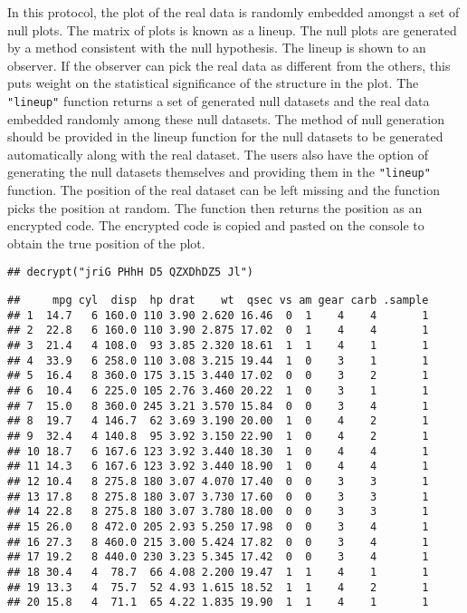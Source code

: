 In this protocol, the plot of the real data is randomly embedded amongst
a set of null plots. The matrix of plots is known as a lineup. The null
plots are generated by a method consistent with the null hypothesis. The
lineup is shown to an observer. If the observer can pick the real data
as different from the others, this puts weight on the statistical
significance of the structure in the plot. The \texttt{"lineup"}
function returns a set of generated null datasets and the real data
embedded randomly among these null datasets. The method of null
generation should be provided in the lineup function for the null
datasets to be generated automatically along with the real dataset. The
users also have the option of generating the null datasets themselves
and providing them in the \texttt{"lineup"} function. The position of
the real dataset can be left missing and the function picks the position
at random. The function then returns the position as an encrypted code.
The encrypted code is copied and pasted on the console to obtain the
true position of the plot.

\begin{Shaded}
\begin{Highlighting}[]
\NormalTok{(}\NormalTok{(}\NormalTok{(}\NormalTok{)}
\end{Highlighting}
\end{Shaded}

\begin{verbatim}
## decrypt("jriG PHhH D5 QZXDhDZ5 Jl")
\end{verbatim}

\begin{verbatim}
##     mpg cyl  disp  hp drat    wt  qsec vs am gear carb .sample
## 1  14.7   6 160.0 110 3.90 2.620 16.46  0  1    4    4       1
## 2  22.8   6 160.0 110 3.90 2.875 17.02  0  1    4    4       1
## 3  21.4   4 108.0  93 3.85 2.320 18.61  1  1    4    1       1
## 4  33.9   6 258.0 110 3.08 3.215 19.44  1  0    3    1       1
## 5  16.4   8 360.0 175 3.15 3.440 17.02  0  0    3    2       1
## 6  10.4   6 225.0 105 2.76 3.460 20.22  1  0    3    1       1
## 7  15.0   8 360.0 245 3.21 3.570 15.84  0  0    3    4       1
## 8  19.7   4 146.7  62 3.69 3.190 20.00  1  0    4    2       1
## 9  32.4   4 140.8  95 3.92 3.150 22.90  1  0    4    2       1
## 10 18.7   6 167.6 123 3.92 3.440 18.30  1  0    4    4       1
## 11 14.3   6 167.6 123 3.92 3.440 18.90  1  0    4    4       1
## 12 10.4   8 275.8 180 3.07 4.070 17.40  0  0    3    3       1
## 13 17.8   8 275.8 180 3.07 3.730 17.60  0  0    3    3       1
## 14 22.8   8 275.8 180 3.07 3.780 18.00  0  0    3    3       1
## 15 26.0   8 472.0 205 2.93 5.250 17.98  0  0    3    4       1
## 16 27.3   8 460.0 215 3.00 5.424 17.82  0  0    3    4       1
## 17 19.2   8 440.0 230 3.23 5.345 17.42  0  0    3    4       1
## 18 30.4   4  78.7  66 4.08 2.200 19.47  1  1    4    1       1
## 19 13.3   4  75.7  52 4.93 1.615 18.52  1  1    4    2       1
## 20 15.8   4  71.1  65 4.22 1.835 19.90  1  1    4    1       1
\end{verbatim}

